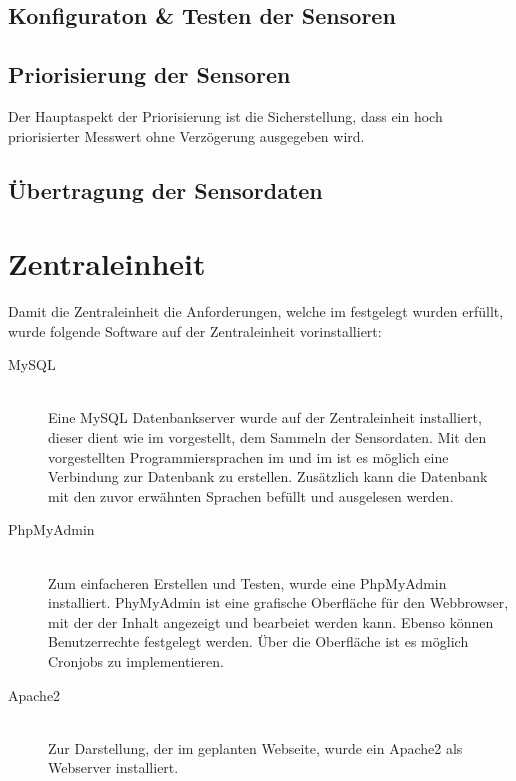 \subsection{Konfiguraton \& Testen der Sensoren}
\subsection{Priorisierung der Sensoren}
Der Hauptaspekt der Priorisierung ist die Sicherstellung, dass ein hoch priorisierter Messwert ohne Verzögerung ausgegeben wird.
\subsection{Übertragung der Sensordaten}

\section{Zentraleinheit}%
Damit die Zentraleinheit die Anforderungen, welche im  festgelegt wurden erfüllt, wurde folgende Software auf der Zentraleinheit vorinstalliert:
\begin{description}
	\item[MySQL] \hfill \\
	Eine MySQL Datenbankserver wurde auf der Zentraleinheit installiert, dieser dient wie im  vorgestellt, dem Sammeln der Sensordaten. Mit den vorgestellten Programmiersprachen im  und im  ist es möglich eine Verbindung zur Datenbank zu erstellen. Zusätzlich kann die Datenbank mit den zuvor erwähnten Sprachen befüllt und ausgelesen werden.
	\item[PhpMyAdmin] \hfill \\
	Zum einfacheren Erstellen und Testen, wurde eine PhpMyAdmin installiert. PhyMyAdmin ist eine grafische Oberfläche für den Webbrowser, mit der der Inhalt angezeigt und bearbeiet werden kann. Ebenso können Benutzerrechte festgelegt werden. Über die Oberfläche ist es möglich Cronjobs zu implementieren.
	\item[Apache2] \hfill \\
	Zur Darstellung, der im  geplanten Webseite, wurde ein Apache2 als Webserver installiert.
\end{description}
